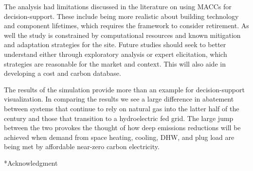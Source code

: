 \documentclass[twocolumn, a4paper,10pt]{article}
\makeatletter
\renewcommand\section{\@startsection{section}{1}{\z@}{3pt}{3pt}{\normalfont\large\bfseries}}
\makeatother
\begin{document}

The analysis had limitations discussed in the literature on using MACCs for decision-support. These include being more realistic about building technology and component lifetimes, which requires the framework to consider retirement. As well the study is constrained by computational resources and known mitigation and adaptation strategies for the site. Future studies should seek to better understand either through exploratory analysis or expert elicitation, which strategies are reasonable for the market and context. This will also aide in developing a cost and carbon database.

The results of the simulation provide more than an example for decision-support visualization. In comparing the results we see a large difference in abatement between systems that continue to rely on natural gas into the latter half of the century and those that transition to a hydroelectric fed grid. The large jump between the two provokes the thought of how deep emissions reductions will be achieved when demand from space heating, cooling, DHW, and plug load are being met by affordable near-zero carbon electricity.

\section*{Acknowledgment}


\footnotesize


\end{document}
